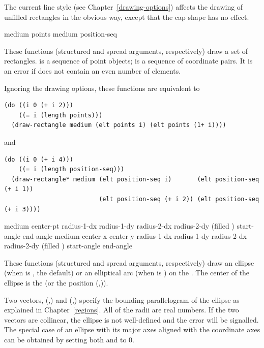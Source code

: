 The current line style (see Chapter~\ref{drawing-options}) affects the drawing
of unfilled rectangles in the obvious way, except that the cap shape has no
effect.


  {medium points \key \DrawingOptions \LineJointOptions}
 {medium position-seq \key \DrawingOptions \LineJointOptions}

These functions (structured and spread arguments, respectively) draw a set of
rectangles.   is a sequence of point objects;  is
a sequence of coordinate pairs.  It is an error if  does not
contain an even number of elements.

Ignoring the drawing options, these functions are equivalent to
\begin{verbatim}
(do ((i 0 (+ i 2)))
    ((= i (length points)))
  (draw-rectangle medium (elt points i) (elt points (1+ i))))
\end{verbatim}
and
\begin{verbatim}
(do ((i 0 (+ i 4)))
    ((= i (length position-seq)))
  (draw-rectangle* medium (elt position-seq i)       (elt position-seq (+ i 1))
                          (elt position-seq (+ i 2)) (elt position-seq (+ i 3))))
\end{verbatim}


  {medium center-pt radius-1-dx radius-1-dy radius-2-dx radius-2-dy
                        \key (filled ) start-angle end-angle
                        \DrawingOptions \LineCapOptions}
 {medium center-x center-y radius-1-dx radius-1-dy radius-2-dx radius-2-dy
                        \key (filled ) start-angle end-angle
                        \DrawingOptions \LineCapOptions}

These functions (structured and spread arguments, respectively) draw an ellipse
(when  is , the default) or an elliptical arc (when
 is ) on the  .  The center of
the ellipse is the   (or the position
(,)).

Two vectors, (,) and
(,) specify the bounding parallelogram of the
ellipse as explained in Chapter~\ref{regions}.  All of the radii are real
numbers.  If the two vectors are collinear, the ellipse is not well-defined and
the  error will be signalled.  The special case
of an ellipse with its major axes aligned with the coordinate axes can be
obtained by setting both  and  to 0.

